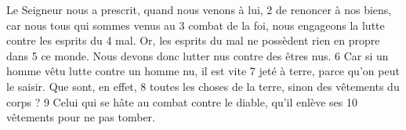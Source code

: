 Le Seigneur nous a prescrit, quand nous venons à lui,	 
2	 	de renoncer à nos biens, car nous tous qui sommes venus au	 
3	 	combat de la foi, nous engageons la lutte contre les esprits du	 
4	 	mal. Or, les esprits du mal ne possèdent rien en propre dans	 
5	 	ce monde. Nous devons donc lutter nus contre des êtres nus.	 
6	 	Car si un homme vêtu lutte contre un homme nu, il est vite	 
7	 	jeté à terre, parce qu'on peut le saisir. Que sont, en effet,	 
8	 	toutes les choses de la terre, sinon des vêtements du corps ?	 
9	 	Celui qui se hâte au combat contre le diable, qu'il enlève ses	 
10	 	vêtements pour ne pas tomber.